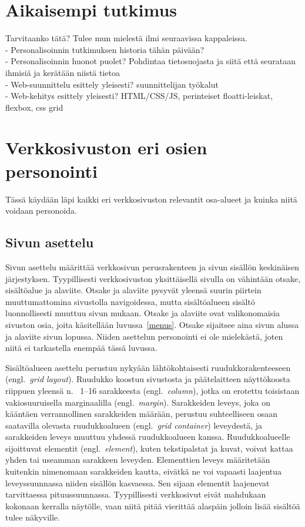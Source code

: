\documentclass[finnish, 12pt, a4paper, elec, utf8, a-1b, online]{aaltothesis}
\begin{document}
\clearpage

\section{Aikaisempi tutkimus}

Tarvitaanko tätä? Tulee mun mielestä ilmi seuraavissa kappaleissa.
\\
- Personalisoinnin tutkimuksen historia tähän päivään?
\\
- Personalisoinnin huonot puolet? Pohdintaa tietosuojasta ja siitä että
seurataan ihmisiä ja kerätään niistä tietoa
\\
- Web-suunnittelu esittely yleisesti? suunnittelijan työkalut
\\
- Web-kehitys esittely yleisesti? HTML/CSS/JS, perinteiset floatti-leiskat, flexbox, css grid
\\

\clearpage

\section{Verkkosivuston eri osien personointi}

Tässä käydään läpi kaikki eri verkkosivuston relevantit osa-alueet ja kuinka
niitä voidaan personoida.

\subsection{Sivun asettelu}

Sivun asettelu määrittää verkkosivun perusrakenteen ja sivun sisällön
keskinäisen järjestyksen. Tyypillisesti verkkosivuston yksittäisellä sivulla on
vähintään otsake, sisältöalue ja alaviite. Otsake ja alaviite pysyvät yleensä
suurin piirtein muuttumattomina sivustolla navigoidessa, mutta sisältöalueen
sisältö luonnollisesti muuttuu sivun mukaan. Otsake ja alaviite ovat
valikonomaisia sivuston osia, joita käsitellään luvussa~\ref{menus}. Otsake
sijaitsee aina sivun alussa ja alaviite sivun lopussa. Niiden asettelun
personointi ei ole mielekästä, joten niitä ei tarkastella enempää tässä luvussa.

Sisältöalueen asettelu perustuu nykyään lähtökohtaisesti ruudukkorakenteeseen
(engl.\ \textit{grid layout}). Ruudukko koostuu sivustosta ja päätelaitteen
näyttökoosta riippuen yleensä n. \ 1--16 sarakkeesta (engl.\ \textit{column}),
jotka on erotettu toisistaan vakiosuuruisella marginaalilla (engl.\
\textit{margin}). Sarakkeiden leveys, joka on kääntäen verrannollinen
sarakkeiden määrään, perustuu suhteelliseen osaan saatavilla olevasta
ruudukkoalueen (engl.\ \textit{grid container}) leveydestä, ja sarakkeiden
leveys muuttuu yhdessä ruudukkoalueen kanssa. Ruudukkoalueelle sijoittuvat
elementit (engl.\ \textit{element}), kuten tekstipalstat ja kuvat, voivat kattaa
yhden tai useamman sarakkeen leveyden. Elementtien leveys määritetään kuitenkin
nimenomaan sarakkeiden kautta, eivätkä ne voi vapaasti laajentua leveyssuunnassa
niiden sisällön kasvaessa. Sen sijaan elementit laajenevat tarvittaessa
pituussuunnassa. Tyypillisesti verkkosivut eivät mahdukaan kokonaan kerralla
näytölle, vaan niitä pitää vierittää alaspäin jolloin lisää sisältöä tulee
näkyville.
\end{document}
